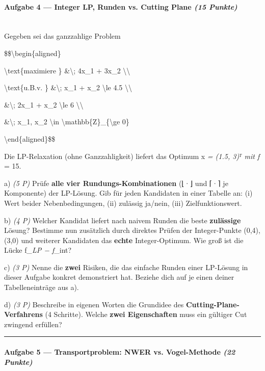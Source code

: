 \documentclass[11pt, a4paper]{article}
\begin{document}
\paragraph{Aufgabe 4 — Integer LP, Runden vs. Cutting Plane \textit{(15 Punkte)}}\mbox{}\\[2pt]

Gegeben sei das ganzzahlige Problem


\$\$\textbackslash{}begin\{aligned\}

\textbackslash{}text\{maximiere \} \&\textbackslash{}; 4x\_1 + 3x\_2 \textbackslash{}\textbackslash{}

\textbackslash{}text\{u.B.v. \} \&\textbackslash{}; x\_1 + x\_2 \textbackslash{}le 4.5 \textbackslash{}\textbackslash{}

\&\textbackslash{}; 2x\_1 + x\_2 \textbackslash{}le 6 \textbackslash{}\textbackslash{}

\&\textbackslash{}; x\_1, x\_2 \textbackslash{}in \textbackslash{}mathbb\{Z\}\_\{\textbackslash{}ge 0\}

\textbackslash{}end\{aligned\}\$\$


Die LP-Relaxation (ohne Ganzzahligkeit) liefert das Optimum x⃗\textit{ = (1.5, 3)ᵀ mit f} = 15.


a) \textit{(5 P)} Prüfe \textbf{alle vier Rundungs-Kombinationen} (⌊·⌋ und ⌈·⌉ je Komponente) der LP-Lösung. Gib für jeden Kandidaten in einer Tabelle an: (i) Wert beider Nebenbedingungen, (ii) zulässig ja/nein, (iii) Zielfunktionswert.


b) \textit{(4 P)} Welcher Kandidat liefert nach naivem Runden die beste \textbf{zulässige} Lösung? Bestimme nun zusätzlich durch direktes Prüfen der Integer-Punkte (0,4), (3,0) und weiterer Kandidaten das \textbf{echte} Integer-Optimum. Wie groß ist die Lücke f\textit{\_LP − f}\_int?


c) \textit{(3 P)} Nenne die \textbf{zwei} Risiken, die das einfache Runden einer LP-Lösung in dieser Aufgabe konkret demonstriert hat. Beziehe dich auf je einen deiner Tabelleneinträge aus a).


d) \textit{(3 P)} Beschreibe in eigenen Worten die Grundidee des \textbf{Cutting-Plane-Verfahrens} (4 Schritte). Welche \textbf{zwei Eigenschaften} muss ein gültiger Cut zwingend erfüllen?



\noindent\textcolor{rulegray}{\rule{\linewidth}{0.4pt}}


\paragraph{Aufgabe 5 — Transportproblem: NWER vs. Vogel-Methode \textit{(22 Punkte)}}\mbox{}\\[2pt]
\end{document}
